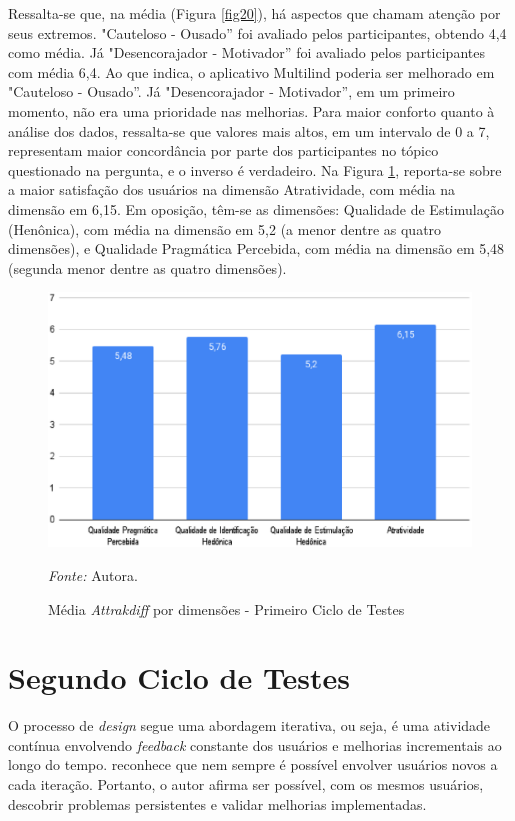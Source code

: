 Ressalta-se que, na média (Figura \ref{fig20}), há aspectos que chamam atenção por seus extremos. "Cauteloso - Ousado'' foi avaliado pelos participantes, obtendo 4,4 como média. Já "Desencorajador - Motivador'' foi avaliado pelos 
participantes com média 6,4. Ao que indica, o aplicativo Multilind poderia ser melhorado em "Cauteloso - Ousado''. Já "Desencorajador - Motivador'', em um primeiro momento, não era uma prioridade nas melhorias. Para maior conforto 
quanto à análise dos dados, ressalta-se que valores mais altos, em um intervalo de 0 a 7, representam maior concordância por parte dos participantes no tópico questionado na pergunta, e o inverso é verdadeiro. Na Figura \ref{fig21}, 
reporta-se sobre a maior satisfação dos usuários na dimensão Atratividade, com média na dimensão em 6,15. Em oposição, têm-se as dimensões: Qualidade de Estimulação (Henônica), com média na dimensão em 5,2 (a menor dentre 
as quatro dimensões), e Qualidade Pragmática Percebida, com média na dimensão em 5,48 (segunda menor dentre as quatro dimensões).

\begin{figure}[h!]
	\centering
	\caption{Média \textit{Attrakdiff} por dimensões - Primeiro Ciclo de Testes}
	\begin{adjustbox}{center}
		\includegraphics[width=1\textwidth]{figuras/media-separada.eps}
	\end{adjustbox}
	\begin{tablenotes}[flushleft]
		\centering
		\item \textit{Fonte:} Autora.
	\end{tablenotes}
	\label{fig21}
\end{figure}

\section{Segundo Ciclo de Testes}
\label{sec:Segundo Ciclo}
O processo de \textit{design} segue uma abordagem iterativa, ou seja, é uma atividade contínua envolvendo \textit{feedback} constante dos usuários e melhorias incrementais ao longo do tempo.  
reconhece que nem sempre é possível envolver usuários novos a cada iteração. Portanto, o autor afirma ser possível, com os mesmos usuários, descobrir problemas persistentes e validar melhorias implementadas. 

